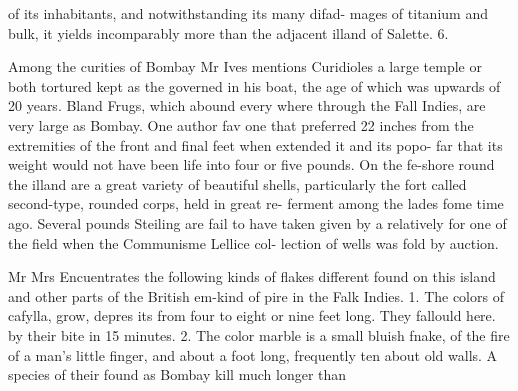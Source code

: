 of its inhabitants, and notwithstanding its many difad-
mages of titanium and bulk, it yields incomparably
more than the adjacent illand of Salette. 6.\par\medskip
Among the curities of Bombay Mr Ives mentions Curidioles
a large temple or both tortured kept as the governed in his
boat, the age of which was upwards of 20 years. Bland
Frugs, which abound every where through the Fall
Indies, are very large as Bombay. One author fav
one that preferred 22 inches from the extremities of
the front and final feet when extended it and its popo-
far that its weight would not have been life into four
or five pounds. On the fe-shore round the illand are
a great variety of beautiful shells, particularly the fort
called second-type, rounded corps, held in great re-
ferment among the lades fome time ago. Several pounds
Steiling are fail to have taken given by a relatively for
one of the field when the Communisme Lellice col-
lection of wells was fold by auction.\par\medskip
Mr Mrs Encuentrates the following kinds of flakes different
found on this island and other parts of the British em-kind of
pire in the Falk Indies. 1. The colors of cafylla, grow, depres
its from four to eight or nine feet long. They fallould here.
by their bite in 15 minutes. 2. The color marble is
a small bluish fnake, of the fire of a man's little finger,
and about a foot long, frequently ten about old walls.
A species of their found as Bombay kill much longer
than\par\medskip

